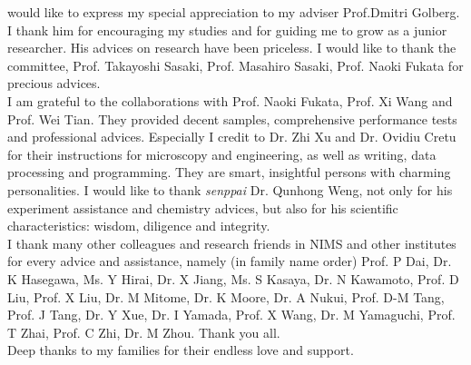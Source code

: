 
 would like to express my special appreciation to my adviser Prof.Dmitri Golberg. I thank him for encouraging my studies and for guiding me to grow as a junior researcher. His advices on research have been priceless. I would like to thank the committee, Prof. Takayoshi Sasaki, Prof. Masahiro Sasaki, Prof. Naoki Fukata for precious advices. \\
I am grateful to the collaborations with Prof. Naoki Fukata, Prof. Xi Wang and Prof. Wei Tian. They provided decent samples, comprehensive performance tests and professional advices. 
Especially I credit to Dr. Zhi Xu and Dr. Ovidiu Cretu for their instructions for microscopy and engineering, as well as writing, data processing and programming. They are smart, insightful persons with charming personalities. 
I would like to thank {\em senppai} Dr. Qunhong Weng, not only for his experiment assistance and chemistry advices, but also for his scientific characteristics: wisdom, diligence and integrity. \\
I thank many other colleagues and research friends in NIMS and other institutes for every advice and assistance, namely (in family name order) Prof. P Dai, Dr. K Hasegawa, Ms. Y Hirai, Dr. X Jiang, Ms. S Kasaya, Dr. N Kawamoto, Prof. D Liu, Prof. X Liu, Dr. M Mitome, Dr. K Moore, Dr. A Nukui, Prof. D-M Tang, Prof. J Tang, Dr. Y Xue, Dr. I Yamada, Prof. X Wang, Dr. M Yamaguchi, Prof. T Zhai, Prof. C Zhi, Dr. M Zhou. Thank you all. 
\\
Deep thanks to my families for their endless love and support. 
